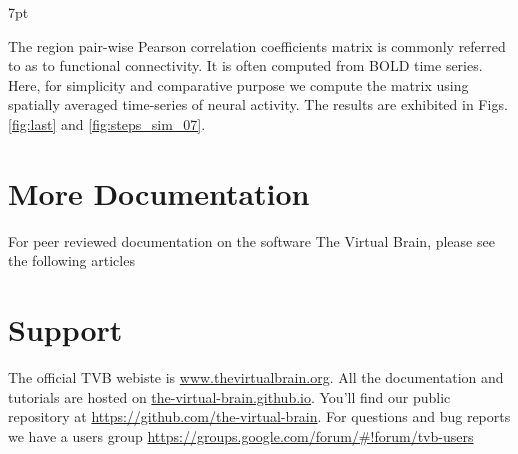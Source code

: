 \documentclass{tufte-handout}
\newenvironment{blah}{%
  \def\FrameCommand{%
    \hspace{1pt}%
    {\color{DarkOrange}\vrule width 2pt}%
    {\color{PeachPuff}\vrule width 4pt}%
    \colorbox{PeachPuff}%
  }%
  \MakeFramed{\advance\hsize-\width\FrameRestore}%
  \noindent\hspace{-4.55pt}%
  \begin{adjustwidth}{}{7pt}%
  \vspace{2pt}\vspace{2pt}%
}
{%
  \vspace{2pt}\end{adjustwidth}\endMakeFramed%
}
\begin{document}
\begin{blah}
The region pair-wise Pearson correlation coefficients matrix is commonly referred to as to functional connectivity. It is often computed from BOLD time series. Here, for simplicity and comparative purpose we compute the matrix using spatially averaged time-series of neural activity. The results are exhibited in Figs. \ref{fig:last} and \ref{fig:steps_sim_07}.
\end{blah}

\section{More Documentation}\label{sec:more-doc}
For peer reviewed documentation on the software The Virtual Brain, please see the following articles \citep{Sanz-Leon_2013,  Woodman_2014}


\section{Support}\label{sec:support}

The official TVB webiste is \url{www.thevirtualbrain.org}.  
All the documentation and tutorials are hosted on \url{the-virtual-brain.github.io}.
You'll find our public  repository at \url{https://github.com/the-virtual-brain}. 
For questions and bug reports we have a users group \url{https://groups.google.com/forum/#!forum/tvb-users}



\end{document}

